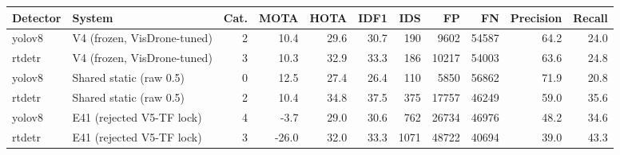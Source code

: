 \begin{tabular}{llrrrrrrrrr}
\toprule
Detector & System & Cat. & MOTA & HOTA & IDF1 & IDS & FP & FN & Precision & Recall \\
\midrule
yolov8 & V4 (frozen, VisDrone-tuned) & 2 & 10.4 & 29.6 & 30.7 & 190 & 9602 & 54587 & 64.2 & 24.0 \\
rtdetr & V4 (frozen, VisDrone-tuned) & 3 & 10.3 & 32.9 & 33.3 & 186 & 10217 & 54003 & 63.6 & 24.8 \\
yolov8 & Shared static (raw 0.5) & 0 & 12.5 & 27.4 & 26.4 & 110 & 5850 & 56862 & 71.9 & 20.8 \\
rtdetr & Shared static (raw 0.5) & 2 & 10.4 & 34.8 & 37.5 & 375 & 17757 & 46249 & 59.0 & 35.6 \\
yolov8 & E41 (rejected V5-TF lock) & 4 & -3.7 & 29.0 & 30.6 & 762 & 26734 & 46976 & 48.2 & 34.6 \\
rtdetr & E41 (rejected V5-TF lock) & 3 & -26.0 & 32.0 & 33.3 & 1071 & 48722 & 40694 & 39.0 & 43.3 \\
\bottomrule
\end{tabular}
